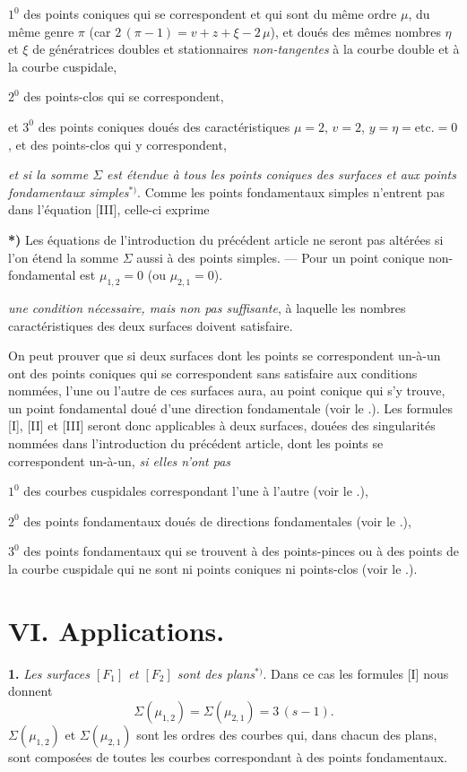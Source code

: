 \documentclass{article}
\begin{document}
$1^0$ des points coniques qui se correspondent et qui sont du même ordre $\mu$, du même genre $\pi$ (car $2\,(\pi - 1) = v + z + \xi - 2\,\mu$), et doués des mêmes nombres $\eta$ et $\xi$ de génératrices doubles et stationnaires \emph{non-tangentes} à la courbe double et à la courbe cuspidale,

$2^0$ des points-clos qui se correspondent,

et $3^0$ des points coniques doués des caractéristiques $\mu = 2$, $v = 2$, $y = \eta = \text{etc.} = 0$, et des points-clos qui y correspondent,

\emph{et si la somme $\Sigma$ est étendue à tous les points coniques des surfaces et aux points fondamentaux simples}${}^{*)}$. Comme les points fondamentaux simples n'entrent pas dans l'équation [III], celle-ci exprime

\textbf{*)} Les équations de l'introduction du précédent article ne seront pas altérées si l'on étend la somme $\Sigma$ aussi à des points simples. --- Pour un point conique non-fondamental est $\mu_{1, 2} = 0$ (ou $\mu_{2, 1} = 0$).

\emph{une condition nécessaire, mais non pas suffisante}, à laquelle les nombres caractéristiques des deux surfaces doivent satisfaire.

On peut prouver que si deux surfaces dont les points se correspondent un-à-un ont des points coniques qui se correspondent sans satisfaire aux conditions nommées, l'une ou l'autre de ces surfaces aura, au point conique qui s'y trouve, un point fondamental doué d'une direction fondamentale (voir le .). Les formules [I], [II] et [III] seront donc applicables à deux surfaces, douées des singularités nommées dans l'introduction du précédent article, dont les points se correspondent un-à-un, \emph{si elles n'ont pas}

$1^0$ des courbes cuspidales correspondant l'une à l'autre (voir le .),

$2^0$ des points fondamentaux doués de directions fondamentales (voir le .),

$3^0$ des points fondamentaux qui se trouvent à des points-pinces ou à des points de la courbe cuspidale qui ne sont ni points coniques ni points-clos (voir le .).

\section*{VI. Applications.}

\textbf{1.} \emph{Les surfaces $[F_1]$ et $[F_2]$ sont des plans}${}^{*)}$. Dans ce cas les formules [I] nous donnent
\[
\Sigma(\mu_{1, 2}) = \Sigma(\mu_{2, 1}) = 3\,(s - 1).
\]
$\Sigma(\mu_{1, 2})$ et $\Sigma(\mu_{2, 1})$ sont les ordres des courbes qui, dans chacun des plans, sont composées de toutes les courbes correspondant à des points fondamentaux.
\end{document}

